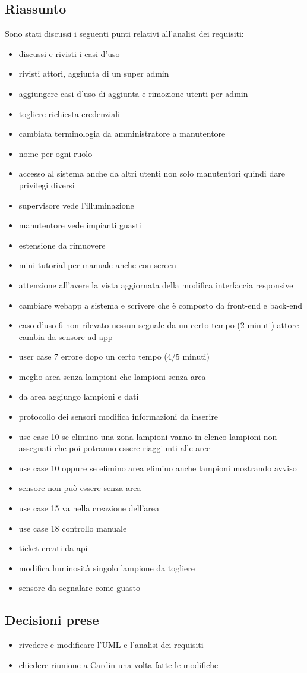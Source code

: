 \documentclass[12pt]{article}
\begin{document}
\subsection{Riassunto}
Sono stati discussi i seguenti punti relativi all'analisi dei requisiti:
\begin{itemize}
    \item discussi e rivisti i casi d'uso 
    \item rivisti attori, aggiunta di un super admin
    \item aggiungere casi d'uso di aggiunta e rimozione utenti per admin
    \item togliere richiesta credenziali
    \item cambiata terminologia da amministratore a manutentore
    \item nome per ogni ruolo
    \item accesso al sistema anche da altri utenti non solo manutentori quindi dare privilegi diversi
    \item supervisore vede l'illuminazione
    \item manutentore vede impianti guasti
    \item estensione da rimuovere
    \item mini tutorial per manuale anche con screen
    \item attenzione all'avere la vista aggiornata della modifica interfaccia responsive
    \item cambiare webapp a sistema e scrivere che è composto da front-end e back-end
    \item caso d'uso 6 non rilevato nessun segnale da un certo tempo (2 minuti) attore cambia da sensore ad app
    \item user case 7 errore dopo un certo tempo (4/5 minuti)
    \item meglio area senza lampioni che lampioni senza area
    \item da area aggiungo lampioni e dati
    \item protocollo dei sensori modifica informazioni da inserire
    \item use case 10 se elimino una zona lampioni vanno in elenco lampioni non assegnati che poi potranno essere riaggiunti alle aree
    \item use case 10 oppure se elimino area elimino anche lampioni mostrando avviso
    \item sensore non può essere senza area
    \item use case 15 va nella creazione dell'area
    \item use case 18 controllo manuale
    \item ticket creati da api
    \item modifica luminosità singolo lampione da togliere
    \item sensore da segnalare come guasto
\end{itemize}
\subsection{Decisioni prese}
\begin{itemize}
    \item rivedere e modificare l'UML e l'analisi dei requisiti
    \item chiedere riunione a Cardin una volta fatte le modifiche
\end{itemize}
\end{document}
